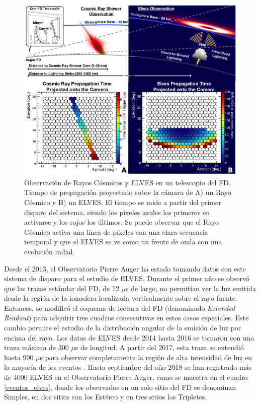 \documentclass[12pt,oneside,openany,letter]{book}
\begin{document}
\begin{figure} 

    \centering
    \includegraphics[scale=0.6]{figures/cr_vs_elves.png}
    \caption[Observaci\'on de Rayos C\'osmicos y ELVES en un telescopio del FD del Observatorio Pierre Auger]{Observaci\'on de Rayos C\'osmicos y ELVES en un telescopio del FD. Tiempo de propagaci\'on proyectado sobre la c\'amara
    de A) un Rayo C\'osmico y B) un ELVES. El tiempo se mide a partir del primer disparo del sistema, siendo los p\'ixeles azules los primeros en activarse y los rojos los \'ultimos. Se puede observar que el Rayo C\'osmico activa una l\'inea de p\'ixeles con una clara secuencia temporal y que el ELVES se ve como un frente de onda con una evolución radial.}
    \label{fig:crs_elves}
\end{figure}

Desde el 2013, el Observatorio Pierre Auger ha estado tomando datos con este sistema de disparo para el estudio de ELVES. Durante el primer año se observ\'o que las trazas estándar del FD, de 72 $\mu$s de largo, no permit\'ian ver la luz emitida desde la regi\'on de la ionosfera localizada verticalmente sobre el rayo fuente. Entonces, se modific\'o el esquema de lectura del FD (denominado \textit{Extended Readout}) para adquirir tres cuadros consecutivos en estos casos especiales. Este cambio permite el estudio de la distribuci\'on angular de la emisi\'on de luz por encima del rayo. Los datos de ELVES desde 2014 hasta 2016 se tomaron con una traza m\'axima de 300 $\mu$s de longitud. A partir del 2017, esta traza se extendi\'o hasta 900 $\mu$s para observar completamente la regi\'on de alta intensidad de luz en la mayor\'ia de los eventos \cite{Mussa2019}. Hasta septiembre del año 2018 se han registrado m\'as de 4000 ELVES en el Observatorio Pierre Auger, como se muestra en el cuadro \ref{eventos_elves}, donde los observados en un solo sitio del FD se denominan Simples, en dos sitios son los Estéreo y en tres sitios los Tripletes.  
\end{document}
